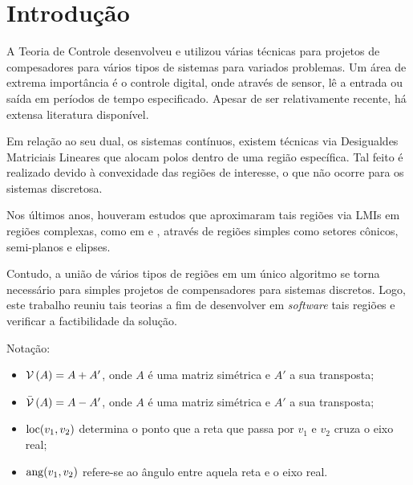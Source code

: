 \chapter{Introdução}
A Teoria de Controle desenvolveu e utilizou várias técnicas para projetos de compesadores para vários tipos de sistemas para variados problemas. Um área de extrema importância é o controle digital, onde através de sensor, lê a entrada ou saída em períodos de tempo especificado. Apesar de ser relativamente recente, há extensa literatura disponível.

Em relação ao seu dual, os sistemas contínuos, existem técnicas via Desigualdes Matriciais Lineares que alocam polos dentro de uma região específica. Tal feito é realizado devido à convexidade das regiões de interesse, o que não ocorre para os sistemas discretosa.

Nos últimos anos, houveram estudos que aproximaram tais regiões via LMIs em regiões complexas, como em  e , através de regiões simples como setores cônicos, semi-planos e elipses.

Contudo, a união de vários tipos de regiões em um único algoritmo se torna necessário para simples projetos de compensadores para sistemas discretos. Logo, este trabalho reuniu tais teorias a fim de desenvolver em \emph{software} tais regiões e verificar a factibilidade da solução.

Notação:
\begin{itemize}
  \item $\operatorname{\mathcal{V}}{(A)} = A + A'$, onde $A$ é uma matriz simétrica e $A'$ a sua transposta;
  \item $\operatorname{\mathcal{\bar{V}}}{(A)} = A - A'$, onde $A$ é uma matriz simétrica e $A'$ a sua transposta;
  \item $\operatorname{loc}(v_1, v_2)$ determina o ponto que a reta que passa por $v_1$ e $v_2$ cruza o eixo real;
  \item $\operatorname{ang}(v_1, v_2)$ refere-se ao ângulo entre aquela reta e o eixo real.
\end{itemize}